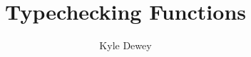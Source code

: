 \documentclass[10pt]{article}
\begin{document}
\title{Typechecking Functions}
\author{Kyle Dewey}
\date{}
\maketitle



\end{document}
